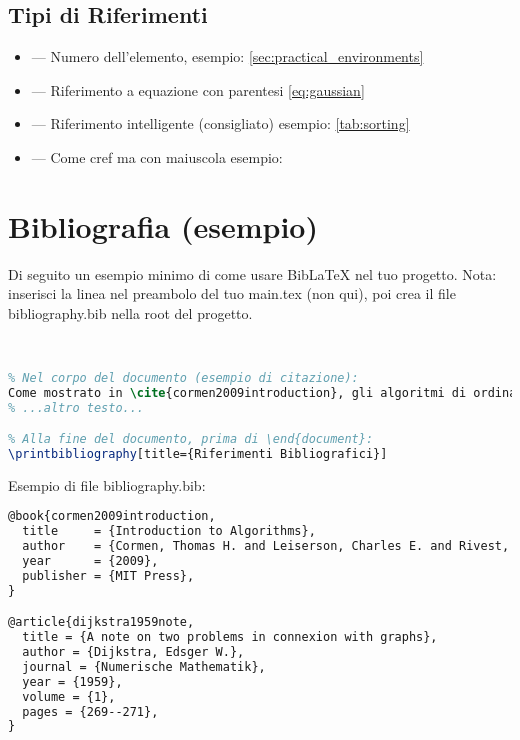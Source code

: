 \documentclass{csnotes}
\begin{document}
\subsection{Tipi di Riferimenti}

\begin{itemize}
    \item {} --- Numero dell'elemento, esempio: \ref{sec:practical_environments}
    \item {} --- Riferimento a equazione con parentesi \eqref{eq:gaussian}
    \item {} --- Riferimento intelligente (consigliato) esempio: \cref{tab:sorting}
    \item {} --- Come cref ma con maiuscola esempio: 
\end{itemize}


\section{Bibliografia (esempio)}

Di seguito un esempio minimo di come usare BibLaTeX nel tuo progetto.  
Nota: inserisci la linea \verb|| nel preambolo del tuo main.tex (non qui), poi crea il file bibliography.bib nella root del progetto.

\begin{lstlisting}[language=TeX]
% Nel preambolo del main.tex:


% Nel corpo del documento (esempio di citazione):
Come mostrato in \cite{cormen2009introduction}, gli algoritmi di ordinamento...
% ...altro testo...

% Alla fine del documento, prima di \end{document}:
\printbibliography[title={Riferimenti Bibliografici}]
\end{lstlisting}

Esempio di file bibliography.bib:

\begin{lstlisting}[language=TeX, caption=Esempio file bibliography.bib]
@book{cormen2009introduction,
  title     = {Introduction to Algorithms},
  author    = {Cormen, Thomas H. and Leiserson, Charles E. and Rivest, Ronald L. and Stein, Clifford},
  year      = {2009},
  publisher = {MIT Press},
}

@article{dijkstra1959note,
  title = {A note on two problems in connexion with graphs},
  author = {Dijkstra, Edsger W.},
  journal = {Numerische Mathematik},
  year = {1959},
  volume = {1},
  pages = {269--271},
}
\end{lstlisting}
\end{document}
